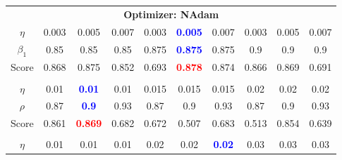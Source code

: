 \documentclass[prl,twocolumn]{revtex4-1}
\begin{document}
\begin{table}[!h]
    \centering
    \begin{tabular}{c|ccccccccc}
        
        \toprule
        \multicolumn{10}{c}{\small\textbf{Optimizer: NAdam}}  \\
        \colrule
        {\small $\eta$}   &   {\scriptsize 0.003} & {\scriptsize 0.005} & {\scriptsize 0.007} & {\scriptsize 0.003} & {\scriptsize \textcolor{blue}{\bf0.005}}  & {\scriptsize 0.007} & {\scriptsize 0.003} & {\scriptsize 0.005}  & {\scriptsize 0.007} \\
        {\small $\beta_1$}&   {\scriptsize 0.85} & {\scriptsize 0.85} & {\scriptsize 0.85} & {\scriptsize 0.875} & {\scriptsize \textcolor{blue}{\bf0.875}}  & {\scriptsize 0.875} & {\scriptsize 0.9} & {\scriptsize 0.9}  & {\scriptsize 0.9} \\
        {\small Score}      &   {\scriptsize 0.868} & {\scriptsize 0.875} & {\scriptsize 0.852} & {\scriptsize 0.693} & {\scriptsize \textcolor{red}{\bf0.878}}  & {\scriptsize 0.874} & {\scriptsize 0.866} & {\scriptsize 0.869}  & {\scriptsize 0.691} \\
        \botrule
        \multicolumn{10}{c}{\small\textbf{Optimizer: RMSprop}}  \\
        \colrule
        {\small $\eta$}&  {\scriptsize 0.01} & {\scriptsize \textcolor{blue}{\bf0.01}}   & {\scriptsize 0.01} & {\scriptsize 0.015} & {\scriptsize 0.015} & {\scriptsize 0.015} & {\scriptsize 0.02} & {\scriptsize 0.02} & {\scriptsize 0.02} \\
        {\small $\rho$}&  {\scriptsize 0.87} & {\scriptsize \textcolor{blue}{\bf0.9}}   & {\scriptsize 0.93} & {\scriptsize 0.87} & {\scriptsize 0.9} & {\scriptsize 0.93} & {\scriptsize 0.87} & {\scriptsize 0.9} & {\scriptsize 0.93} \\
        {\small Score}&  {\scriptsize 0.861} & {\scriptsize \textcolor{red}{\bf0.869}}   & {\scriptsize 0.682} & {\scriptsize 0.672} & {\scriptsize 0.507} & {\scriptsize 0.683} & {\scriptsize 0.513} & {\scriptsize 0.854} & {\scriptsize 0.639} \\
        \botrule
        \multicolumn{10}{c}{\small\textbf{Optimizer: Nesterov-SGD}}  \\
        \colrule
        {\small $\eta$}  & {\scriptsize 0.01} & {\scriptsize 0.01} & {\scriptsize 0.01} & {\scriptsize 0.02} & {\scriptsize 0.02} & {\scriptsize \textcolor{blue}{\bf0.02}} & {\scriptsize 0.03} & {\scriptsize 0.03} & {\scriptsize 0.03} \\

\end{tabular}
\end{table}
\end{document}
